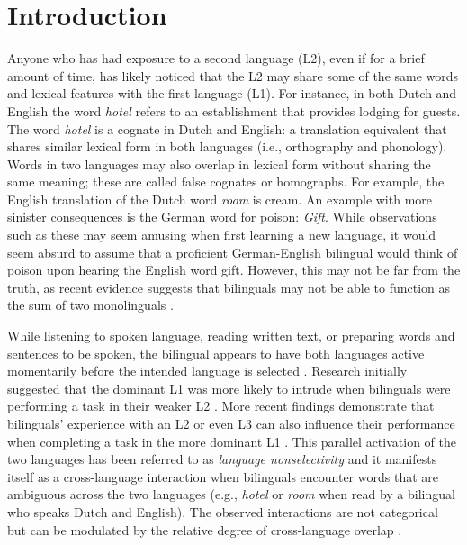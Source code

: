 \chapter{Introduction}\label{Intro}
Anyone who has had exposure to a second language (L2), even if for a brief amount of time, has likely noticed that the L2 may share some of the same words and lexical features with the first language (L1). For instance, in both Dutch and English the word \textit{hotel} refers to an establishment that provides lodging for guests. The word \textit{hotel} is a cognate in Dutch and English: a translation equivalent that shares similar lexical form in both languages (i.e., orthography and phonology). Words in two languages may also overlap in lexical form without sharing the same meaning; these are called false cognates or homographs. For example, the English translation of the Dutch word \textit{room} is cream. An example with more sinister consequences is the German word for poison: \textit{Gift}. While observations such as these may seem amusing when first learning a new language, it would seem absurd to assume that a proficient German-English bilingual would think of poison upon hearing the English word gift. However, this may not be far from the truth, as recent evidence suggests that bilinguals may not be able to function as the sum of two monolinguals \parencite[][]{Grosjean1989}.

While listening to spoken language, reading written text, or preparing words and sentences to be spoken, the bilingual appears to have both languages active momentarily before the intended language is selected \parencite[e.g.,][]{Dijkstra2005,Kroll2005,Marian2003}. Research initially suggested that the dominant L1 was more likely to intrude when bilinguals were performing a task in their weaker L2 \parencite[e.g.,][]{Dijkstra1999, Dijkstra1998}. More recent findings demonstrate that bilinguals' experience with an L2 or even L3 can also influence their performance when completing a task in the more dominant L1 \parencite[e.g.,][]{VanHell2002}. This parallel activation of the two languages has been referred to as \textit{language nonselectivity} and it manifests itself as a cross-language interaction when bilinguals encounter words that are ambiguous across the two languages (e.g., \textit{hotel} or \textit{room} when read by a bilingual who speaks Dutch and English). The observed interactions are not categorical but can be modulated by the relative degree of cross-language overlap \parencite[e.g.,][]{Schwartz2007}.

